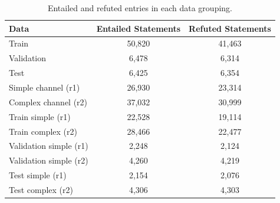 \begin{table}[ht]
\center
\begin{tabular}{lcc}
\hline
Data & Entailed Statements & Refuted Statements\\
\hline
Train & 50,820 & 41,463 \\
Validation & 6,478 & 6,314 \\
Test & 6,425 & 6,354 \\
Simple channel (r1) & 26,930 & 23,314 \\
Complex channel (r2) & 37,032 & 30,999 \\
Train simple (r1) & 22,528 & 19,114 \\
Train complex (r2) & 28,466 & 22,477 \\
Validation simple (r1) & 2,248 & 2,124 \\
Validation simple (r2) & 4,260 & 4,219 \\
Test simple (r1) & 2,154 & 2,076 \\
Test complex (r2) & 4,306 & 4,303 \\
\hline
\end{tabular}
\caption{Entailed and refuted entries in each data grouping.}
\label{tab:tabfact_ent_ref_breakdown}
\end{table}